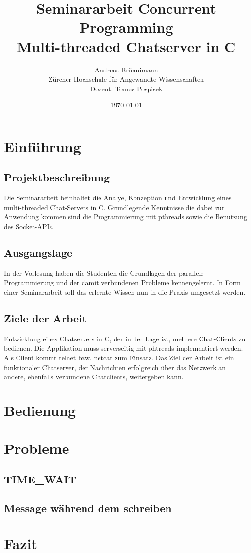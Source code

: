 \documentclass[a4paper]{article}
\title {Seminararbeit Concurrent Programming\\
Multi-threaded Chatserver in C\\}
\author {Andreas Brönnimann\\
Zürcher Hochschule für Angewandte Wissenschaften\\
Dozent: Tomas Pospisek}
\date {\today}
\begin{document}
\maketitle
\setcounter{page}{0}
\thispagestyle{empty}

\newpage

\setcounter{tocdepth}{3}
\tableofcontents

\newpage

\section{Einführung}
\subsection{Projektbeschreibung}
Die Seminararbeit beinhaltet die Analye, Konzeption und Entwicklung eines multi-threaded Chat-Servers in C. Grundlegende Kenntnisse die dabei zur Anwendung kommen sind die Programmierung mit pthreads sowie die Benutzung des Socket-APIs.

\subsection{Ausgangslage}
In der Vorlesung haben die Studenten die Grundlagen der parallele Programmierung und der damit verbundenen Probleme kennengelernt. In Form einer Seminararbeit soll das erlernte Wissen nun in die Praxis umgesetzt werden.

\subsection{Ziele der Arbeit}
Entwicklung eines Chatservers in C, der in der Lage ist, mehrere Chat-Clients zu bedienen. Die Applikation muss serverseitig mit phtreads implementiert werden. Als Client kommt telnet bzw. netcat zum Einsatz. Das Ziel der Arbeit ist ein funktionaler Chatserver, der Nachrichten erfolgreich über das Netzwerk an andere, ebenfalls verbundene Chatclients, weitergeben kann.

\section{Bedienung}
\section{Probleme}
\subsection{TIME\_WAIT}
\subsection{Message während dem schreiben}
\section{Fazit}
\end{document}
